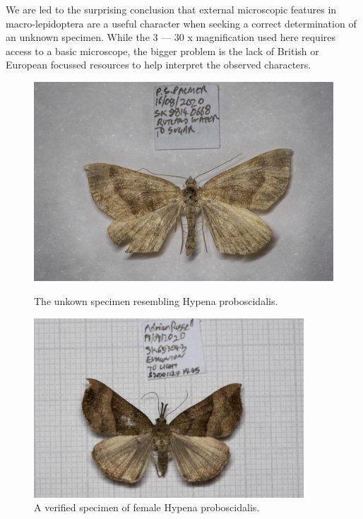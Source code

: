 \documentclass[]{article}
\begin{document}
We are led to the surprising conclusion that external microscopic features in macro-lepidoptera are a useful character when seeking a correct determination of an unknown specimen. While the  3 --- 30 x magnification used here requires access to a basic microscope, the bigger problem is the lack of British or European focussed resources to help interpret the observed characters.


\begin{figure}
	\centering
	\begin{minipage}{0.45\textwidth}
		\centering
	\includegraphics[width=0.9\linewidth]{202009131026PJP-1}
	\caption{The unkown specimen resembling Hypena proboscidalis.}
	\label{fig:202009131026pjp-1}
	\end{minipage}\hfill
	\begin{minipage}{0.45\textwidth}
		\centering
		\includegraphics[width=0.9\textwidth]{S202012271445-1} %
		\caption{A verified specimen of female Hypena proboscidalis.}
		\label{fig:S202012271446-1}
	\end{minipage}
\end{figure}
\end{document}
